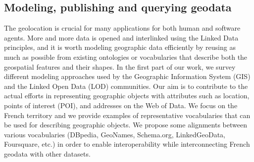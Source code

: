 \subsection{Modeling, publishing and querying geodata}
The geolocation is crucial for many applications for both human and software agents. More and more data is opened and interlinked using the Linked Data principles, and it is worth modeling geographic data efficiently by reusing as much as possible from existing ontologies or vocabularies that describe both the geospatial features and their shapes. In the first part of our work, we survey different modeling approaches used by the Geographic Information System (GIS) and the Linked Open Data (LOD) communities. Our aim is to contribute to the actual efforts in representing geographic objects with attributes such as location, points of interest (POI), and addresses on the Web of Data. We focus on the French territory and we provide examples of representative vocabularies that can be used for describing geographic objects. We propose some alignments between various vocabularies (DBpedia, GeoNames, Schema.org, LinkedGeoData, Foursquare, etc.) in order to enable interoperability while interconnecting French geodata with other datasets.

